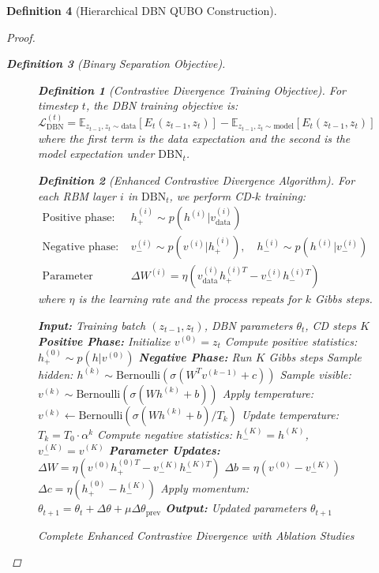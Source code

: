 \documentclass{article}
\newtheorem{definition}{Definition}
\begin{document}
\begin{definition}[Hierarchical DBN QUBO Construction]
\begin{proof}
\begin{definition}[Binary Separation Objective]
\begin{figure}[H]
\begin{definition}[Contrastive Divergence Training Objective]
For timestep $t$, the DBN training objective is:
\begin{equation}
\mathcal{L}_{\text{DBN}}^{(t)} = \mathbb{E}_{z_{t-1}, z_t \sim \text{data}}[E_t(z_{t-1}, z_t)] - \mathbb{E}_{z_{t-1}, z_t \sim \text{model}}[E_t(z_{t-1}, z_t)]
\end{equation}
where the first term is the data expectation and the second is the model expectation under $\text{DBN}_t$.
\end{definition}

\begin{definition}[Enhanced Contrastive Divergence Algorithm]
For each RBM layer $i$ in $\text{DBN}_t$, we perform CD-$k$ training:
\begin{align}
\text{Positive phase:} \quad &h_+^{(i)} \sim p(h^{(i)} | v_{\text{data}}^{(i)})\\
\text{Negative phase:} \quad &v_-^{(i)} \sim p(v^{(i)} | h_+^{(i)}), \quad h_-^{(i)} \sim p(h^{(i)} | v_-^{(i)})\\
\text{Parameter update:} \quad &\Delta W^{(i)} = \eta (v_{\text{data}}^{(i)} h_+^{(i)T} - v_-^{(i)} h_-^{(i)T})
\end{align}
where $\eta$ is the learning rate and the process repeats for $k$ Gibbs steps.
\end{definition}

\begin{algorithm}
\caption{Complete Enhanced Contrastive Divergence with Ablation Studies}
\begin{algorithmic}[1]
\STATE \textbf{Input:} Training batch $(z_{t-1}, z_t)$, DBN parameters $\theta_t$, CD steps $K$
\STATE \textbf{Positive Phase:} Initialize $v^{(0)} = z_t$
\STATE Compute positive statistics: $h_+^{(0)} \sim p(h|v^{(0)})$
\STATE \textbf{Negative Phase:} Run $K$ Gibbs steps
    \STATE Sample hidden: $h^{(k)} \sim \text{Bernoulli}(\sigma(W^T v^{(k-1)} + c))$
    \STATE Sample visible: $v^{(k)} \sim \text{Bernoulli}(\sigma(W h^{(k)} + b))$
        \STATE Apply temperature: $v^{(k)} \leftarrow \text{Bernoulli}(\sigma(W h^{(k)} + b)/T_k)$
        \STATE Update temperature: $T_k = T_0 \cdot \alpha^k$
    \ENDIF
\ENDFOR
\STATE Compute negative statistics: $h_-^{(K)} = h^{(K)}$, $v_-^{(K)} = v^{(K)}$
\STATE \textbf{Parameter Updates:}
\STATE $\Delta W = \eta (v^{(0)} h_+^{(0)T} - v_-^{(K)} h_-^{(K)T})$
\STATE $\Delta b = \eta (v^{(0)} - v_-^{(K)})$
\STATE $\Delta c = \eta (h_+^{(0)} - h_-^{(K)})$
\STATE Apply momentum: $\theta_{t+1} = \theta_t + \Delta\theta + \mu \Delta\theta_{\text{prev}}$
\STATE \textbf{Output:} Updated parameters $\theta_{t+1}$
\end{algorithmic}
\end{algorithm}


\end{figure}
\end{definition}
\end{proof}
\end{definition}
\end{document}
